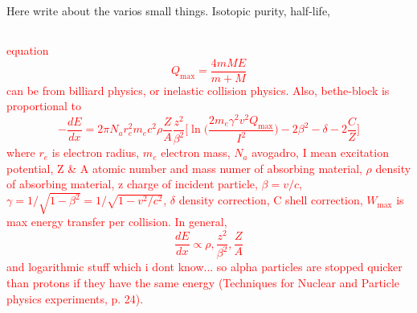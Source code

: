 \documentclass[a4paper,11pt,twoside]{book}
\begin{document}
Here write about the varios small things. Isotopic purity, half-life, 


\subsection*{}
\noindent 

\textcolor{red}{equation $$Q_\text{max}=\frac{4mM E}{m+M}$$ can be from billiard physics, or inelastic collision physics. Also, bethe-block is proportional to 
\begin{equation}
    -\frac{dE}{dx}=2\pi N_a r_e^2 m_e c^2\rho \frac{Z}{A}\frac{z^2}{\beta^2}\Big[\ln \Big( \frac{2m_e \gamma^2 v^2 Q_\text{max}}{I^2} \Big)-2\beta^2 -\delta - 2 \frac{C}{Z}\Big]
\end{equation}
where $r_e$ is electron radius, $m_e$ electron mass, $N_a$ avogadro, I mean excitation potential, Z \& A atomic number and mass numer of absorbing material, $\rho$ density of absorbing material, z charge of incident particle, $\beta=v/c$, $\gamma=1/\sqrt{1-\beta^2}= 1/\sqrt{1-v^2/c^2}$, $\delta$ density correction, C shell correction, $W_\text{max}$ is max energy transfer per collision. In general, $$\frac{dE}{dx}\propto \rho,\frac{z^2}{\beta^2},\frac{Z}{A}$$ and logarithmic stuff which i dont know... so alpha particles are stopped quicker than protons if they have the same energy (Techniques for Nuclear and Particle physics experiments, p. 24). }
\end{document}
